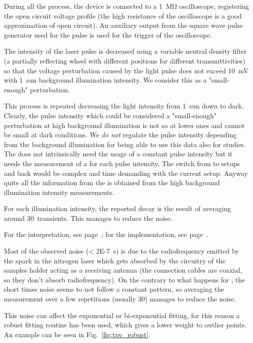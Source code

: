 		During all the process, the device is connected to a \SI{1}{\Mohm} oscilloscope, registering the open circuit voltage profile (the high resistance of the oscilloscope is a good approximation of open circuit). An auxiliary output from the square wave pulse generator used for the pulse is used for the trigger of the oscilloscope.

		The intensity of the laser pulse is decreased using a variable neutral density filter (a partially reflecting wheel with different positions for different transmittivities) so that the voltage perturbation caused by the light pulse does not exceed \SI{10}{\mV} with 1~sun background illumination intensity. We consider this as a "small-enough" perturbation.

		This process is repeated decreasing the light intensity from 1~sun down to dark. Clearly, the pulse intensity which could be considered a "small-enough" perturbation at high background illumination is not so at lower ones and cannot be small at dark conditions. We \emph{do not} regulate the pulse intensity depending from the background illumination for being able to use this data also for  studies. The  does not intrinsically need the usage of a constant pulse intensity but it needs the measurement of a  for each pulse intensity. The switch from  to  setups and back would be complex and time demanding with the current setup. Anyway quite all the information from the  is obtained from the high background illumination intensity measurements.

		For each illumination intensity, the reported decay is the result of averaging around 30~transients. This manages to reduce the noise.

		For the interpretation, see page~\pageref{interpretation_tpv}; for the implementation, see page~\pageref{r_tpv}.


		\label{tpv_robust}
			Most of the observed noise (\SI{< 2E-7}{\s}) is due to the radiofrequency emitted by the spark in the nitrogen laser which gets absorbed by the circuitry of the samples holder acting as a receiving antenna (the connection cables are coaxial, so they don't absorb radiofrequency). On the contrary to what happens for , the short times noise seems to not follow a constant pattern, so averaging the measurement over a few repetitions (usually 30) manages to reduce the noise.

			This noise can affect the exponential or bi-exponential fitting, for this reason a robust fitting routine has been used, which gives a lower weight to outlier points. An example can be seen in Fig.~\ref{fig:tpv_robust}.
			
